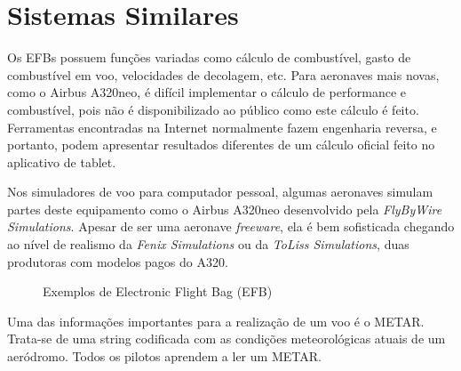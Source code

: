 \chapter{Sistemas Similares}
Os EFBs possuem funções variadas como cálculo de combustível, gasto de combustível
em voo, velocidades de decolagem, etc. \cite{wired-efb} Para aeronaves mais novas, como o Airbus 
A320neo, é difícil implementar o cálculo de performance e combustível, pois não 
é disponibilizado ao público como este cálculo é feito. Ferramentas encontradas 
na Internet \cite{a320-perf} normalmente fazem engenharia reversa, e portanto, 
podem apresentar resultados diferentes de um cálculo oficial feito no aplicativo
de tablet.

Nos simuladores de voo para computador pessoal, algumas aeronaves simulam partes
deste equipamento como o Airbus A320neo desenvolvido pela \textit{FlyByWire Simulations}. 
Apesar de ser uma aeronave \textit{freeware}, ela é bem sofisticada chegando ao 
nível de realismo da \textit{Fenix Simulations} ou da \textit{ToLiss Simulations}, 
duas produtoras com modelos pagos do A320.

\begin{figure}%
    \centering
    \qquad
    \caption{Exemplos de Electronic Flight Bag (EFB)}
    \label{fig:example}%
\end{figure}

Uma das informações importantes para a realização de um voo é o METAR. Trata-se 
de uma string codificada com as condições meteorológicas atuais de um aeródromo. 
Todos os pilotos aprendem a ler um METAR.

